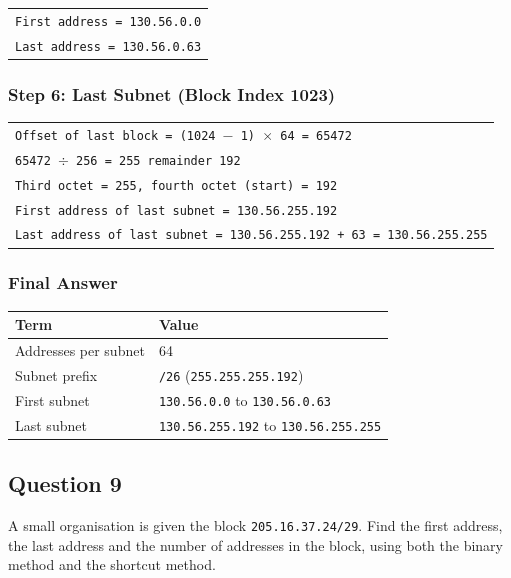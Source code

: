 \documentclass[11pt,a4paper]{article}
\begin{document}
\begin{tabularx}{\textwidth}{@{}X@{}}
\texttt{First address = 130.56.0.0} \\
\texttt{Last address = 130.56.0.63} \\
\end{tabularx}

\subsubsection*{Step 6: Last Subnet (Block Index 1023)}

\begin{tabularx}{\textwidth}{@{}X@{}}
\texttt{Offset of last block = (1024 $-$ 1) $\times$ 64 = 65472} \\
\texttt{65472 $\div$ 256 = 255 remainder 192} \\
\texttt{Third octet = 255, fourth octet (start) = 192} \\
\texttt{First address of last subnet = 130.56.255.192} \\
\texttt{Last address of last subnet = 130.56.255.192 + 63 = 130.56.255.255} \\
\end{tabularx}

\subsubsection*{Final Answer}

\begin{tabularx}{\textwidth}{@{}lX@{}}
\toprule
\rowcolor{tablehead}\textbf{Term} & \textbf{Value} \\
\midrule
Addresses per subnet & 64 \\
Subnet prefix & \texttt{/26} (\texttt{255.255.255.192}) \\
First subnet & \texttt{130.56.0.0} to \texttt{130.56.0.63} \\
Last subnet & \texttt{130.56.255.192} to \texttt{130.56.255.255} \\
\bottomrule
\end{tabularx}

\subsection*{Question 9}

A small organisation is given the block \texttt{205.16.37.24/29}. Find the first address, the
last address and the number of addresses in the block, using both the binary method and the
shortcut method.
\end{document}
